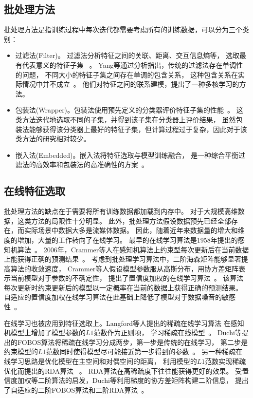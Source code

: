 \documentclass[doctor]{ustcthesis}
\begin{document}
\subsection{批处理方法}
批处理方法是指训练过程中每次迭代都需要考虑所有的训练数据，可以分为三个类别：
\begin{itemize}
    \item 过滤法(Filter)。 过滤法分析特征之间的关联、距离、交互信息熵等，
        选取最有代表意义的特征子集~\cite{yu2003feature,jiang2015relative,li2016feature} 。
        Yang等通过分析指出，传统的过滤法存在单调性的问题，
        不同大小的特征子集之间存在单调的包含关系，
        这种包含关系在实际情况中并不成立~\cite{yang2013efficient}。
        他们对特征之间的联系建模，提出了一种多核学习的方法。
    \item 包装法(Wrapper)。包装法使用预先定义的分类器评价特征子集的性能~\cite{kohavi1997wrappers}。
        这类方法迭代地选取不同的子集，并得到该子集在分类器上评价结果，
        虽然包装法能够获得该分类器上最好的特征子集，但计算过程过于复杂，因此对于该类方法的研究相对较少。
    \item 嵌入法(Embedded)。嵌入法将特征选取与模型训练融合，
        是一种综合平衡过滤法的高效率和包装法的高准确性的方案~\cite{pappu2015sparse,le2014feature}。
\end{itemize}

\subsection{在线特征选取}
批处理方法的缺点在于需要将所有训练数据都加载到内存中。
对于大规模高维数据，这类方法的局限性十分明显。
此外，批处理方法假设数据预先已经全部存在，而实际场景中数据大多是流媒体数据。
因此，随着近年来数据量的增大和维度的增加，大量的工作转向了在线学习。
最早的在线学习算法是1958年提出的感知机算法~\cite{rosenblatt1958perceptron}。
2006年，Crammer等人在感知机算法上约束型每次更新后在当前数据上能获得正确的预测结果~\cite{crammer2006online}。
考虑到批处理学习算法中，二阶海森矩阵能够显著提高算法的收敛速度，
Crammer等人假设模型参数服从高斯分布，用协方差矩阵表示当前模型对于参数的不确定性，
提出了置信度加权的在线学习算法~\cite{crammer2009multi}。
该算法每次更新时约束更新后的模型以一定概率在当前的数据上获得正确的预测结果。
自适应的置信度加权在线学习算法在此基础上降低了模型对于数据噪音的敏感性~\cite{crammer2009adaptive}。

在线学习也被应用到特征选取上。Langford等人提出的稀疏在线学习算法
在感知机模型上增加了模型参数的$L1$范数作为正则项，
学习稀疏在线模型~\cite{langford2009sparse}。
Duchi等提出的FOBOS算法将稀疏在线学习分成两步，第一步是传统的在线学习，
第二步是约束模型的$L1$范数同时使得模型尽可能接近第一步得到的参数~\cite{duchi2009efficient}。
另一种稀疏在线学习思路是优化模型在主空间和对偶空间的距离，
利用模型的$L1$范数实现稀疏优化而提出的RDA算法~\cite{xiao2010dual} 。
RDA算法在高稀疏度下往往能获得更好的效果。
受置信度加权等二阶算法的启发，Duchi等利用梯度的协方差矩阵构建二阶信息，
提出了自适应的二阶FOBOS算法和二阶RDA算法~\cite{duchi2011adaptive}。
\end{document}
